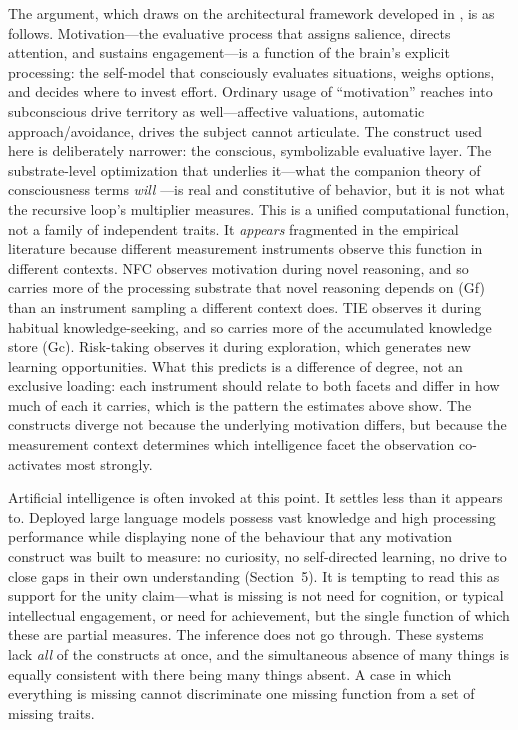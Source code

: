 \documentclass[12pt,a4paper]{article}
\begin{document}
\begin{enumerate}
The argument, which draws on the architectural framework developed in \citet{Gruber2026}, is as follows. Motivation---\hspace{0pt}the evaluative process that assigns salience, directs attention, and sustains engagement---\hspace{0pt}is a function of the brain's explicit processing: the self-model that consciously evaluates situations, weighs options, and decides where to invest effort. Ordinary usage of ``motivation'' reaches into subconscious drive territory as well---\hspace{0pt}affective valuations, automatic approach/avoidance, drives the subject cannot articulate. The construct used here is deliberately narrower: the conscious, symbolizable evaluative layer. The substrate-level optimization that underlies it---\hspace{0pt}what the companion theory of consciousness terms \emph{will} \citep[\S4.2.2]{Gruber2026}---\hspace{0pt}is real and constitutive of behavior, but it is not what the recursive loop's multiplier measures. This is a unified computational function, not a family of independent traits. It \emph{appears} fragmented in the empirical literature because different measurement instruments observe this function in different contexts. NFC observes motivation during novel reasoning, and so carries more of the processing substrate that novel reasoning depends on (Gf) than an instrument sampling a different context does. TIE observes it during habitual knowledge-seeking, and so carries more of the accumulated knowledge store (Gc). Risk-taking observes it during exploration, which generates new learning opportunities. What this predicts is a difference of degree, not an exclusive loading: each instrument should relate to both facets and differ in how much of each it carries, which is the pattern the estimates above show. The constructs diverge not because the underlying motivation differs, but because the measurement context determines which intelligence facet the observation co-activates most strongly.

Artificial intelligence is often invoked at this point. It settles less than it appears to. Deployed large language models possess vast knowledge and high processing performance while displaying none of the behaviour that any motivation construct was built to measure: no curiosity, no self-directed learning, no drive to close gaps in their own understanding (Section~5). It is tempting to read this as support for the unity claim---\hspace{0pt}what is missing is not need for cognition, or typical intellectual engagement, or need for achievement, but the single function of which these are partial measures. The inference does not go through. These systems lack \emph{all} of the constructs at once, and the simultaneous absence of many things is equally consistent with there being many things absent. A case in which everything is missing cannot discriminate one missing function from a set of missing traits.


\end{enumerate}
\end{document}
